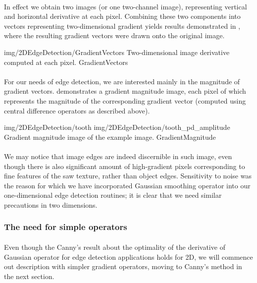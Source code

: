 \paragraph*{}
In effect we obtain two images (or one two-channel image), representing vertical and horizontal derivative at each pixel. Combining these two components into vectors representing two-dimensional gradient yields results demonstrated in , where the resulting gradient vectors were drawn onto the original image.

\oneFigure
{img/2DEdgeDetection/GradientVectors}
{Two-dimensional image derivative computed at each pixel.}
{GradientVectors}
{\basicWidth}

\paragraph*{}
For our needs of edge detection, we are interested mainly in the magnitude of gradient vectors.  demonstrates a gradient magnitude image, each pixel of which represents the magnitude of the corresponding gradient vector (computed using central difference operators as described above).

\twoFigures
{img/2DEdgeDetection/tooth}
{img/2DEdgeDetection/tooth_pd_amplitude}
{Gradient magnitude image of the example image.}
{GradientMagnitude}
{\basicWidth}

\paragraph*{}
We may notice that image edges are indeed discernible in such image, even though there is also significant amount of high-gradient pixels corresponding to fine features of the saw texture, rather than object edges. Sensitivity to noise was the reason for which we have incorporated Gaussian smoothing operator into our one-dimensional edge detection routines; it is clear that we need similar precautions in two dimensions.

\subsubsection{The need for simple operators}

\paragraph*{}
Even though the Canny's result\cite{Canny86} about the optimality of the derivative of Gaussian operator for edge detection applications holds for 2D, we will commence out description with simpler gradient operators, moving to Canny's method in the next section.

